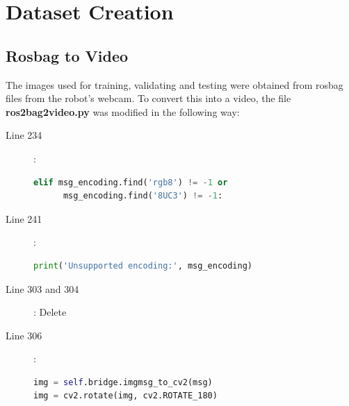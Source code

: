 \documentclass[12pt]{article}
\begin{document}
\thispagestyle{fancy}

\newpage
{}
\newpage
\renewcommand*\contentsname{Table of Contents}
\tableofcontents

\clearpage


\newpage

\section{Dataset Creation}

\subsection{Rosbag to Video}
The images used for training, validating and testing were obtained from rosbag files from the robot's webcam. To convert this into a video, the file \textbf{ros2bag2video.py} was modified in the following way:

\begin{description}
\item[Line 234]: 
\begin{lstlisting}[language=Python]
elif msg_encoding.find('rgb8') != -1 or 
      msg_encoding.find('8UC3') != -1:
\end{lstlisting}

\item[Line 241]: 
\begin{lstlisting}[language=Python]
print('Unsupported encoding:', msg_encoding)
\end{lstlisting}

\item[Line 303 and 304]: Delete

\item[Line 306]:  
\begin{lstlisting}[language=Python]
img = self.bridge.imgmsg_to_cv2(msg)
img = cv2.rotate(img, cv2.ROTATE_180)
\end{lstlisting}

\end{description}
\end{document}
